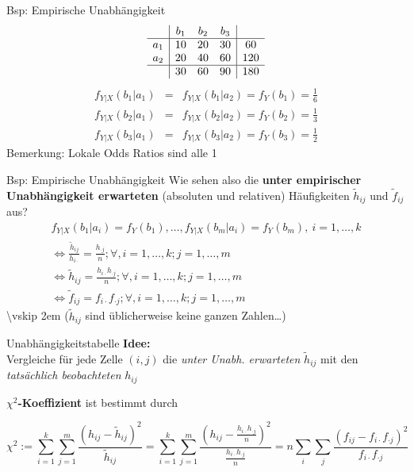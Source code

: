 \documentclass[
  10pt,
  ignorenonframetext,
]{beamer}
\begin{document}
\begin{frame}{Bsp: Empirische Unabhängigkeit}
\label{bsp-empirische-unabhuxe4ngigkeit}
\begin{displaymath}
\begin{array}{c|ccc|c}
 &      b_1 & b_2 & b_3 & \\\hline
 a_1 &  10 & 20 & 30 & 60 \\
 a_2 &  20 & 40 & 60 & 120 \\
 \hline
  &     30 & 60 & 90 & 180
\end{array}
\end{displaymath} \begin{eqnarray*}
f_{Y|X}(b_1|a_1) &=& f_{Y|X}(b_1|a_2) = f_Y(b_1) = \frac{1}{6} \\
f_{Y|X}(b_2|a_1) &=& f_{Y|X}(b_2|a_2) = f_Y(b_2) = \frac{1}{3} \\
f_{Y|X}(b_3|a_1) &=& f_{Y|X}(b_3|a_2) = f_Y(b_3) = \frac{1}{2}
\end{eqnarray*} Bemerkung: Lokale Odds Ratios sind alle 1
\end{frame}

\begin{frame}{Bsp: Empirische Unabhängigkeit}
\label{bsp-empirische-unabhuxe4ngigkeit-1}
Wie sehen also die \textbf{unter empirischer Unabhängigkeit erwarteten}
(absoluten und relativen) Häufigkeiten \(\tilde h_{ij}\) und
\(\tilde f_{ij}\) aus? \[
\begin{array}{l}
f_{Y|X}(b_1|a_i) = f_Y(b_1),\ldots, f_{Y|X}(b_m|a_i) = f_Y(b_m), ~i = 1,\ldots, k\\
\iff  \frac{\tilde{h}_{ij}}{h_{i\cdot}} = \frac{h_{\cdot j}}{n} ;\forall, i = 1, \ldots,k; j = 1,\ldots,m\\
\iff \tilde{h}_{ij} = \frac{h_{i\cdot}h_{\cdot j}}{n} ;\forall, i = 1, \ldots,k; j = 1,\ldots,m\\
\iff \tilde{f}_{ij} = f_{i\cdot}f_{\cdot j} ;\forall, i = 1, \ldots,k; j = 1,\ldots,m
\end{array}
\] \textbackslash vskip 2em (\(\tilde{h}_{ij}\) sind üblicherweise keine
ganzen Zahlen\ldots)
\end{frame}

\begin{frame}{Unabhängigkeitstabelle}
\label{unabhuxe4ngigkeitstabelle}
\textbf{Idee:}\\
Vergleiche für jede Zelle \((i,j)\) die \emph{unter Unabh. erwarteten}
\(\tilde{h}_{ij}\) mit den \emph{tatsächlich beobachteten} \(h_{ij}\)

\(\chi^2\)\textbf{-Koeffizient} ist bestimmt durch

\begin{displaymath}
\chi^2 := \sum_{i=1}^k\sum_{j=1}^m
\frac{\left(h_{ij}-\tilde h_{ij}\right)^2}
{\tilde h_{ij}} =
\sum_{i=1}^k\sum_{j=1}^m
\frac{\left(h_{ij}-\frac{h_{i\cdot}h_{\cdot j}}{n}\right)^2}
{\frac{h_{i\cdot}h_{\cdot j}}{n}} = n\sum_{i}\sum_{j}\frac{(f_{ij}-f_{i\cdot}f_{\cdot j})^2}{f_{i\cdot}f_{\cdot j}}
\end{displaymath}
\end{frame}
\end{document}
